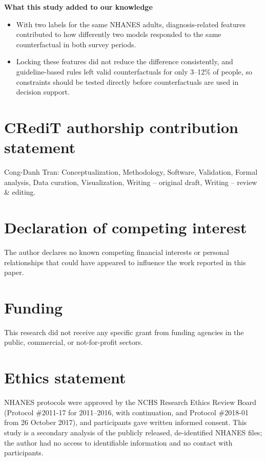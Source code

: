 \documentclass[final,5p,times,twocolumn]{elsarticle}
\providecommand{\tightlist}{\setlength{\itemsep}{0pt}\setlength{\parskip}{0pt}}
\begin{document}
\textbf{What this study added to our knowledge}

\begin{itemize}
\tightlist
\item
  With two labels for the same NHANES adults, diagnosis-related features
  contributed to how differently two models responded to the same
  counterfactual in both survey periods.
\item
  Locking these features did not reduce the difference consistently, and
  guideline-based rules left valid counterfactuals for only 3--12\% of
  people, so constraints should be tested directly before
  counterfactuals are used in decision support.
\end{itemize}

\section*{CRediT authorship contribution statement}

Cong-Danh Tran: Conceptualization, Methodology, Software, Validation,
Formal analysis, Data curation, Visualization, Writing -- original
draft, Writing -- review \& editing.

\section*{Declaration of competing interest}

The author declares no known competing financial interests or personal
relationships that could have appeared to influence the work reported in
this paper.

\section*{Funding}

This research did not receive any specific grant from funding agencies
in the public, commercial, or not-for-profit sectors.

\section*{Ethics statement}

NHANES protocols were approved by the NCHS Research Ethics Review Board
(Protocol \#2011-17 for 2011--2016, with continuation, and Protocol
\#2018-01 from 26 October 2017), and participants gave written informed
consent. This study is a secondary analysis of the publicly released,
de-identified NHANES files; the author had no access to identifiable
information and no contact with participants.
\end{document}
